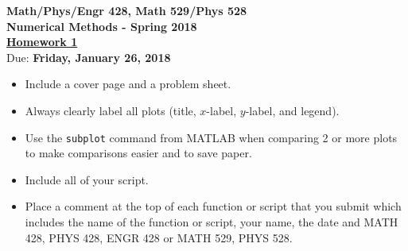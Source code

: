 \documentclass [12pt]{article}
\begin{document}
\def\e{\mathop{\rm e}\nolimits}
\noindent
\begin{center}
{ \bf  {Math/Phys/Engr 428, Math 529/Phys 528 \\
Numerical Methods - Spring 2018 }}\\[7pt]
\underline{\bf Homework 1}\\

Due: {\bf Friday, January 26, 2018}

\end{center}

\begin{itemize}
  \item Include a cover page and a problem sheet.

  \item Always clearly label all plots (title, $x$-label, $y$-label,
    and legend).

  \item Use the {\tt subplot} command from MATLAB when comparing 2 or
    more plots to make comparisons easier and to save paper.

  \item Include all of your script.

  \item Place a comment at the top of each function
    or script that you submit which includes the name of the
    function or script, your name, the date and MATH 428, PHYS 428, ENGR 428 or MATH 529, PHYS 528.

\end{itemize}



\end{document}
